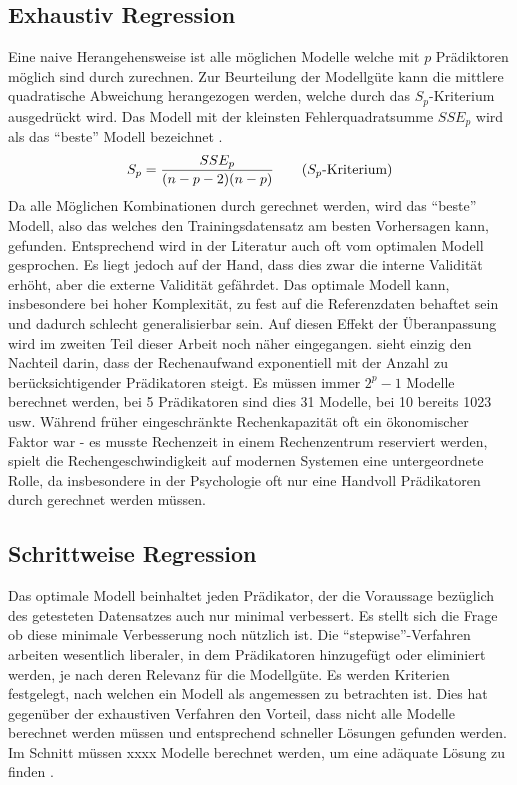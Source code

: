 \documentclass[english,12pt,doc]{apa}
\begin{document}
\subsection{Exhaustiv Regression} 
Eine naive Herangehensweise ist alle möglichen Modelle welche mit $p$ Prädiktoren möglich sind durch zurechnen. 
Zur Beurteilung der Modellgüte kann die mittlere quadratische Abweichung herangezogen werden, welche durch das $S_p$-Kriterium ausgedrückt wird.
Das Modell mit der kleinsten Fehlerquadratsumme $SSE_p$ wird als das  ``beste'' Modell bezeichnet \cite[p. 6]{thompson1978selection}. 
\begin{equation}
S_p = {{SSE_p}\over{ (n-p-2)(n-p)}}
\tag{$S_p$-Kriterium}
\end{equation}
Da alle Möglichen Kombinationen durch gerechnet werden, wird das ``beste'' Modell, also das welches den Trainingsdatensatz am besten Vorhersagen kann, gefunden. 
Entsprechend wird in der Literatur auch oft vom optimalen Modell gesprochen. Es liegt jedoch auf der Hand, dass dies zwar die interne Validität erhöht, aber die externe Validität gefährdet.
Das optimale Modell kann, insbesondere bei hoher Komplexität, zu fest auf die Referenzdaten behaftet sein und dadurch schlecht generalisierbar sein.
Auf diesen Effekt der Überanpassung wird im zweiten Teil dieser Arbeit noch näher eingegangen.  
 sieht einzig den Nachteil darin, dass der Rechenaufwand exponentiell mit der Anzahl zu berücksichtigender Prädikatoren steigt. 
Es müssen immer $2^p-1$ Modelle berechnet werden, bei 5 Prädikatoren sind dies 31 Modelle, bei 10 bereits 1023 usw.
Während früher eingeschränkte Rechenkapazität oft ein ökonomischer Faktor war - es musste Rechenzeit in einem Rechenzentrum reserviert werden, spielt die Rechengeschwindigkeit auf modernen Systemen eine untergeordnete Rolle, da insbesondere in der Psychologie oft nur eine Handvoll Prädikatoren durch gerechnet werden müssen.

\subsection{Schrittweise Regression} Das optimale Modell beinhaltet jeden Prädikator, der die Voraussage bezüglich des getesteten Datensatzes auch nur minimal verbessert. 
Es stellt sich die Frage ob diese minimale Verbesserung noch nützlich ist. 
Die ``stepwise''-Verfahren arbeiten wesentlich liberaler, in dem Prädikatoren hinzugefügt oder eliminiert werden, je nach deren Relevanz für die Modellgüte. 
Es werden Kriterien festgelegt, nach welchen ein Modell als angemessen zu betrachten ist. 
Dies hat gegenüber der exhaustiven Verfahren den Vorteil, dass nicht alle Modelle berechnet werden müssen und entsprechend schneller Lösungen gefunden werden. 
Im Schnitt müssen xxxx Modelle berechnet werden, um eine adäquate Lösung zu finden \cite{tobecite}.
\end{document}
